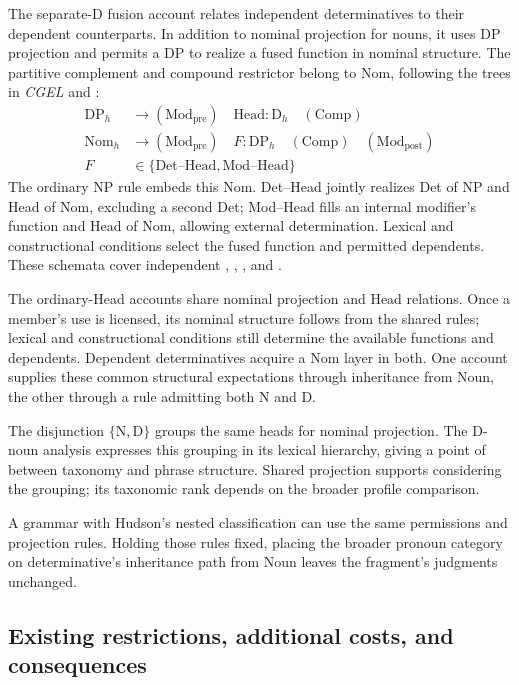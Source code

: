 \documentclass[12pt]{article}
\begin{document}
The separate-D fusion account relates independent determinatives to their dependent counterparts. In addition to nominal projection for nouns, it uses DP projection and permits a DP to realize a fused function in nominal structure. The partitive complement and compound restrictor belong to Nom, following the trees in \textit{CGEL} and \textcite[582]{Payne2007}:
\[
\begin{aligned}
\mathrm{DP}_{h} &\to (\mathrm{Mod}_{\mathrm{pre}})\quad \mathrm{Head}:\mathrm{D}_{h}\quad (\mathrm{Comp}) \\
\mathrm{Nom}_{h} &\to (\mathrm{Mod}_{\mathrm{pre}})\quad F:\mathrm{DP}_{h}\quad (\mathrm{Comp})\quad (\mathrm{Mod}_{\mathrm{post}}) \\
F&\in\{\mathrm{Det\text{--}Head},\mathrm{Mod\text{--}Head}\}
\end{aligned}
\]
The ordinary NP rule embeds this Nom. Det--Head jointly realizes Det of NP and Head of Nom, excluding a second Det; Mod--Head fills an internal modifier's function and Head of Nom, allowing external determination. Lexical and constructional conditions select the fused function and permitted dependents. These schemata cover independent , , , and .

The ordinary-Head accounts share nominal projection and Head relations. Once a member's use is licensed, its nominal structure follows from the shared rules; lexical and constructional conditions still determine the available functions and dependents. Dependent determinatives acquire a Nom layer in both. One account supplies these common structural expectations through inheritance from Noun, the other through a rule admitting both N and D.

The disjunction $\{\mathrm{N},\mathrm{D}\}$ groups the same heads for nominal projection. The D-noun analysis expresses this grouping in its lexical hierarchy, giving a point of  between taxonomy and phrase structure. Shared projection supports considering the grouping; its taxonomic rank depends on the broader profile comparison.

A grammar with Hudson's nested classification can use the same permissions and projection rules. Holding those rules fixed, placing the broader pronoun category on determinative's inheritance path from Noun leaves the fragment's judgments unchanged.

\subsection{Existing restrictions, additional costs, and consequences}\label{sec:costs}
\end{document}
